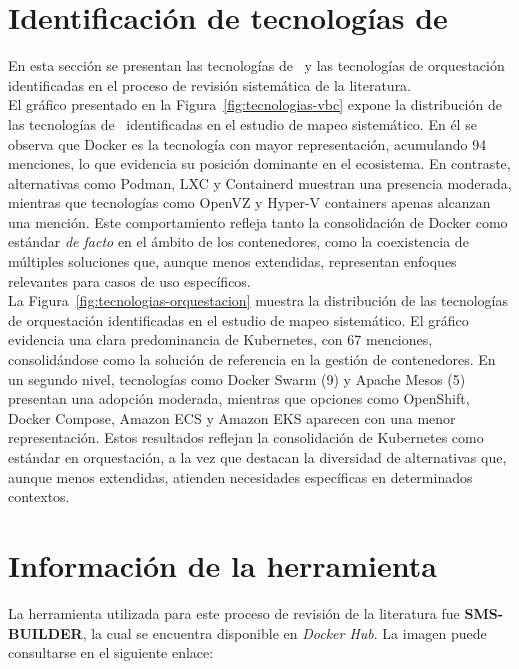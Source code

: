 \section{Identificación de tecnologías de \VBC}\label{sec:tecnologias-vbc-identificadas}
\noindent
En esta sección se presentan las tecnologías de \VBC\ y las tecnologías de orquestación identificadas en el proceso de revisión sistemática de la literatura. \\
\noindent
El gráfico presentado en la Figura~\ref{fig:tecnologias-vbc} expone la distribución de las tecnologías de \VBC\ identificadas en el estudio de mapeo sistemático. En él se observa que Docker es la tecnología con mayor representación, acumulando 94 menciones, lo que evidencia su posición dominante en el ecosistema. En contraste, alternativas como Podman, LXC y Containerd muestran una presencia moderada, mientras que tecnologías como OpenVZ y Hyper-V containers apenas alcanzan una mención. Este comportamiento refleja tanto la consolidación de Docker como estándar \textit{de facto} en el ámbito de los contenedores, como la coexistencia de múltiples soluciones que, aunque menos extendidas, representan enfoques relevantes para casos de uso específicos. \\

\noindent
La Figura~\ref{fig:tecnologias-orquestacion} muestra la distribución de las tecnologías de orquestación identificadas en el estudio de mapeo sistemático. El gráfico evidencia una clara predominancia de Kubernetes, con 67 menciones, consolidándose como la solución de referencia en la gestión de contenedores. En un segundo nivel, tecnologías como Docker Swarm (9) y Apache Mesos (5) presentan una adopción moderada, mientras que opciones como OpenShift, Docker Compose, Amazon ECS y Amazon EKS aparecen con una menor representación. Estos resultados reflejan la consolidación de Kubernetes como estándar en orquestación, a la vez que destacan la diversidad de alternativas que, aunque menos extendidas, atienden necesidades específicas en determinados contextos.


\section{Información de la herramienta}

\noindent
La herramienta utilizada para este proceso de revisión de la literatura fue \textbf{SMS-BUILDER}, la cual se encuentra disponible en \textit{Docker Hub}. La imagen puede consultarse en el siguiente enlace:

